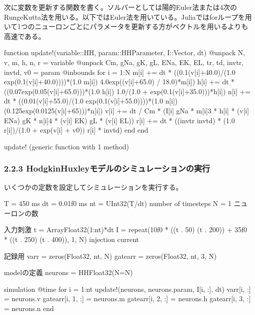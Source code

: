 \documentclass[letterpaper,10pt,english]{sphinxmanual}
\begin{document}
次に変数を更新する関数を書く。ソルバーとしては陽的Euler法または4次のRunge\sphinxhyphen{}Kutta法を用いる。以下ではEuler法を用いている。Juliaではforループを用いて1つのニューロンごとにパラメータを更新する方がベクトルを用いるよりも高速である。

\begin{sphinxVerbatim}[commandchars=\\\{\}]
function update!(variable::HH, param::HHParameter, I::Vector, dt)
    @unpack N, v, m, h, n, r = variable
    @unpack Cm, gNa, gK, gL, ENa, EK, EL, tr, td, invtr, invtd, v0 = param
    @inbounds for i = 1:N
        m[i] += dt * ((0.1(v[i]+40.0)/(1.0 \PYGZhy{} exp(\PYGZhy{}0.1(v[i]+40.0))))*(1.0 \PYGZhy{} m[i]) \PYGZhy{} 4.0exp(\PYGZhy{}(v[i]+65.0) / 18.0)*m[i])
        h[i] += dt * ((0.07exp(\PYGZhy{}0.05(v[i]+65.0)))*(1.0 \PYGZhy{} h[i]) \PYGZhy{} 1.0/(1.0 + exp(\PYGZhy{}0.1(v[i]+35.0)))*h[i])
        n[i] += dt * ((0.01(v[i]+55.0)/(1.0 \PYGZhy{} exp(\PYGZhy{}0.1(v[i]+55.0))))*(1.0 \PYGZhy{} n[i]) \PYGZhy{} (0.125exp(\PYGZhy{}0.0125(v[i]+65)))*n[i])
        v[i] += dt / Cm * (I[i] \PYGZhy{} gNa * m[i]\PYGZca{}3 * h[i] * (v[i] \PYGZhy{} ENa) \PYGZhy{} gK * n[i]\PYGZca{}4 * (v[i] \PYGZhy{} EK) \PYGZhy{} gL * (v[i] \PYGZhy{} EL))
        r[i] += dt * ((invtr \PYGZhy{} invtd) * (1.0 \PYGZhy{} r[i])/(1.0 + exp(\PYGZhy{}v[i] + v0)) \PYGZhy{} r[i] * invtd)
    end
end
\end{sphinxVerbatim}

\begin{sphinxVerbatim}[commandchars=\\\{\}]
update! (generic function with 1 method)
\end{sphinxVerbatim}


\subsubsection{2.2.3 Hodgkin\sphinxhyphen{}Huxleyモデルのシミュレーションの実行}
\label{\detokenize{2-2_hodgkinhuxley:id3}}
いくつかの定数を設定してシミュレーションを実行する。

\begin{sphinxVerbatim}[commandchars=\\\{\}]
T = 450 \PYGZsh{} ms
dt = 0.01f0 \PYGZsh{} ms
nt = UInt32(T/dt) \PYGZsh{} number of timesteps
N = 1 \PYGZsh{} ニューロンの数

\PYGZsh{} 入力刺激
t = Array\PYGZob{}Float32\PYGZcb{}(1:nt)*dt
I = repeat(10f0 * ((t .\PYGZgt{} 50) \PYGZhy{} (t .\PYGZgt{} 200)) + 35f0 * ((t .\PYGZgt{} 250) \PYGZhy{} (t .\PYGZgt{} 400)), 1, N)  \PYGZsh{} injection current

\PYGZsh{} 記録用
varr = zeros(Float32, nt, N)
gatearr = zeros(Float32, nt, 3, N)

\PYGZsh{} modelの定義
neurons = HH\PYGZob{}Float32\PYGZcb{}(N=N)

\PYGZsh{} simulation
@time for i = 1:nt
    update!(neurons, neurons.param, I[i, :], dt)
    varr[i, :] = neurons.v
    gatearr[i, 1, :] = neurons.m
    gatearr[i, 2, :] = neurons.h
    gatearr[i, 3, :] = neurons.n
end
\end{sphinxVerbatim}
\end{document}
